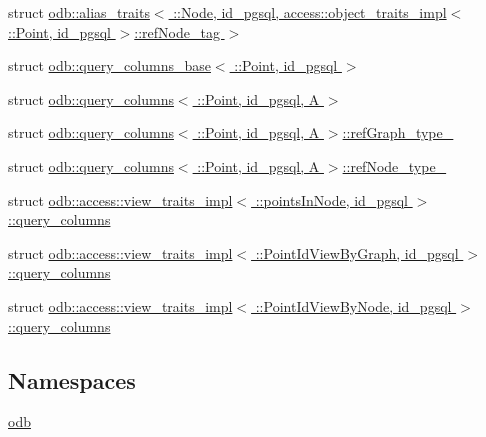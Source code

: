 \begin{DoxyCompactItemize}
\item 
struct \hyperlink{structodb_1_1alias__traits_3_01_1_1_node_00_01id__pgsql_00_01access_1_1object__traits__impl_3_013274b82f95462fed7f5ef459567458b6}{odb\+::alias\+\_\+traits$<$ \+::\+Node, id\+\_\+pgsql, access\+::object\+\_\+traits\+\_\+impl$<$ \+::\+Point, id\+\_\+pgsql $>$\+::ref\+Node\+\_\+tag $>$}
\item 
struct \hyperlink{structodb_1_1query__columns__base_3_01_1_1_point_00_01id__pgsql_01_4}{odb\+::query\+\_\+columns\+\_\+base$<$ \+::\+Point, id\+\_\+pgsql $>$}
\item 
struct \hyperlink{structodb_1_1query__columns_3_01_1_1_point_00_01id__pgsql_00_01_a_01_4}{odb\+::query\+\_\+columns$<$ \+::\+Point, id\+\_\+pgsql, A $>$}
\item 
struct \hyperlink{structodb_1_1query__columns_3_01_1_1_point_00_01id__pgsql_00_01_a_01_4_1_1ref_graph__type__}{odb\+::query\+\_\+columns$<$ \+::\+Point, id\+\_\+pgsql, A $>$\+::ref\+Graph\+\_\+type\+\_\+}
\item 
struct \hyperlink{structodb_1_1query__columns_3_01_1_1_point_00_01id__pgsql_00_01_a_01_4_1_1ref_node__type__}{odb\+::query\+\_\+columns$<$ \+::\+Point, id\+\_\+pgsql, A $>$\+::ref\+Node\+\_\+type\+\_\+}
\item 
struct \hyperlink{structodb_1_1access_1_1view__traits__impl_3_01_1_1points_in_node_00_01id__pgsql_01_4_1_1query__columns}{odb\+::access\+::view\+\_\+traits\+\_\+impl$<$ \+::points\+In\+Node, id\+\_\+pgsql $>$\+::query\+\_\+columns}
\item 
struct \hyperlink{structodb_1_1access_1_1view__traits__impl_3_01_1_1_point_id_view_by_graph_00_01id__pgsql_01_4_1_1query__columns}{odb\+::access\+::view\+\_\+traits\+\_\+impl$<$ \+::\+Point\+Id\+View\+By\+Graph, id\+\_\+pgsql $>$\+::query\+\_\+columns}
\item 
struct \hyperlink{structodb_1_1access_1_1view__traits__impl_3_01_1_1_point_id_view_by_node_00_01id__pgsql_01_4_1_1query__columns}{odb\+::access\+::view\+\_\+traits\+\_\+impl$<$ \+::\+Point\+Id\+View\+By\+Node, id\+\_\+pgsql $>$\+::query\+\_\+columns}
\end{DoxyCompactItemize}
\subsection*{Namespaces}
\begin{DoxyCompactItemize}
\item 
 \hyperlink{namespaceodb}{odb}
\end{DoxyCompactItemize}
